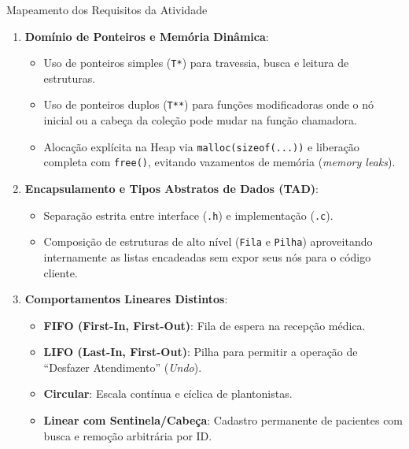\documentclass[11pt,a4paper]{article}
\begin{document}
\begin{destaquebox}{Mapeamento dos Requisitos da Atividade}
\begin{enumerate}
    \item \textbf{Domínio de Ponteiros e Memória Dinâmica}:
    \begin{itemize}
        \item Uso de ponteiros simples (\texttt{T*}) para travessia, busca e leitura de estruturas.
        \item Uso de ponteiros duplos (\texttt{T**}) para funções modificadoras onde o nó inicial ou a cabeça da coleção pode mudar na função chamadora.
        \item Alocação explícita na Heap via \texttt{malloc(sizeof(...))} e liberação completa com \texttt{free()}, evitando vazamentos de memória (\textit{memory leaks}).
    \end{itemize}
    \item \textbf{Encapsulamento e Tipos Abstratos de Dados (TAD)}:
    \begin{itemize}
        \item Separação estrita entre interface (\texttt{.h}) e implementação (\texttt{.c}).
        \item Composição de estruturas de alto nível (\texttt{Fila} e \texttt{Pilha}) aproveitando internamente as listas encadeadas sem expor seus nós para o código cliente.
    \end{itemize}
    \item \textbf{Comportamentos Lineares Distintos}:
    \begin{itemize}
        \item \textbf{FIFO (First-In, First-Out)}: Fila de espera na recepção médica.
        \item \textbf{LIFO (Last-In, First-Out)}: Pilha para permitir a operação de ``Desfazer Atendimento'' (\textit{Undo}).
        \item \textbf{Circular}: Escala contínua e cíclica de plantonistas.
        \item \textbf{Linear com Sentinela/Cabeça}: Cadastro permanente de pacientes com busca e remoção arbitrária por ID.
    \end{itemize}
\end{enumerate}
\end{destaquebox}

\end{document}
